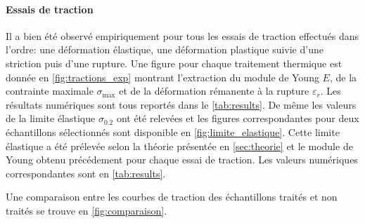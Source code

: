 \paragraph{Essais de traction}
Il a bien été observé empiriquement pour tous les essais de traction effectués dans l'ordre: une déformation élastique, une déformation plastique suivie d'une striction puis d'une rupture. Une figure pour chaque traitement thermique est donnée en \autoref{fig:tractions_exp} montrant l'extraction du module de Young $E$, de la contrainte maximale $\sigma_\mathrm{max}$ et de la déformation rémanente à la rupture $\varepsilon_r$.
Les résultats numériques sont tous reportés dans le \autoref{tab:results}. De même les valeurs de la limite élastique $\sigma_{0.2}$ ont été relevées et les figures correspondantes pour deux échantillons sélectionnés sont disponible en \autoref{fig:limite_elastique}. Cette limite élastique a été prélevée selon la théorie présentée en \autoref{sec:theorie} et le module de Young obtenu précédement pour chaque essai de traction. Les valeurs numériques correspondantes sont en \autoref{tab:results}.

Une comparaison entre les courbes de traction des échantillons traités et non traités se trouve en \autoref{fig:comparaison}.

